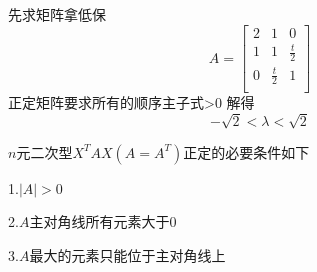 \documentclass[lang=cn,10pt]{elegantbook}
\begin{document}
\begin{solution}
	
	先求矩阵拿低保
	\begin{equation*}
		A=\left[ \begin{matrix}
			2&		1&		0\\
			1&		1&		\frac{t}{2}\\
			0&		\frac{t}{2}&		1\\
		\end{matrix} \right] 
	\end{equation*}
	正定矩阵要求所有的顺序主子式>0
	解得
	\begin{equation*}
		-\sqrt{2}<\lambda<\sqrt{2}
	\end{equation*}
\end{solution}
$n$元二次型$X^{T}AX(A=A^{T})$正定的必要条件如下
\begin{conclusion}
	
	1.$|A|>0$
	
	2.$A$主对角线所有元素大于0
	
	3.$A$最大的元素只能位于主对角线上
\end{conclusion}
\end{document}
